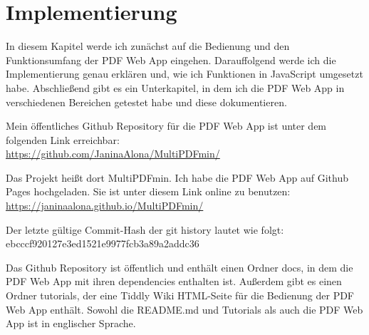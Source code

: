 \chapter{Implementierung}
In diesem Kapitel werde ich zunächst auf die Bedienung und den Funktionsumfang der PDF Web App eingehen. Darauffolgend werde ich die Implementierung genau erklären und, wie ich Funktionen in JavaScript umgesetzt habe. Abschließend gibt es ein Unterkapitel, in dem ich die PDF Web App in verschiedenen Bereichen getestet habe und diese dokumentieren.

Mein öffentliches Github Repository für die PDF Web App ist unter dem folgenden Link erreichbar: \\
\url{https://github.com/JaninaAlona/MultiPDFmin/}

Das Projekt heißt dort MultiPDFmin. Ich habe die PDF Web App auf Github Pages hochgeladen. Sie ist unter diesem Link online zu benutzen: \\
\url{https://janinaalona.github.io/MultiPDFmin/}

Der letzte gültige Commit-Hash der git history lautet wie folgt: \\
ebcccf920127e3ed1521e9977fcb3a89a2addc36

Das Github Repository ist öffentlich und enthält einen Ordner docs, in dem die PDF Web App mit ihren dependencies enthalten ist. Außerdem gibt es einen Ordner tutorials, der eine Tiddly Wiki HTML-Seite für die Bedienung der PDF Web App enthält. Sowohl die README.md und Tutorials als auch die PDF Web App ist in englischer Sprache.




